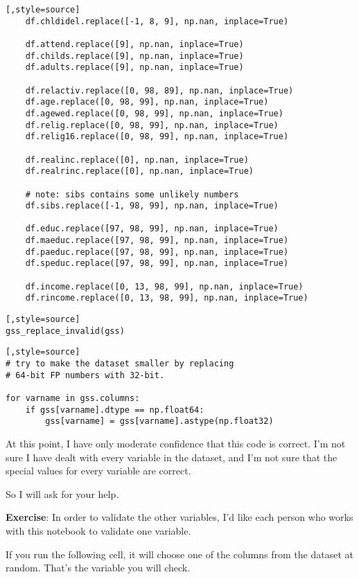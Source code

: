 \begin{lstlisting}[,style=source]
    df.chldidel.replace([-1, 8, 9], np.nan, inplace=True)

    df.attend.replace([9], np.nan, inplace=True)
    df.childs.replace([9], np.nan, inplace=True)
    df.adults.replace([9], np.nan, inplace=True)

    df.relactiv.replace([0, 98, 89], np.nan, inplace=True)
    df.age.replace([0, 98, 99], np.nan, inplace=True)
    df.agewed.replace([0, 98, 99], np.nan, inplace=True)
    df.relig.replace([0, 98, 99], np.nan, inplace=True)
    df.relig16.replace([0, 98, 99], np.nan, inplace=True)
    
    df.realinc.replace([0], np.nan, inplace=True)                  
    df.realrinc.replace([0], np.nan, inplace=True)                  
    
    # note: sibs contains some unlikely numbers
    df.sibs.replace([-1, 98, 99], np.nan, inplace=True)
    
    df.educ.replace([97, 98, 99], np.nan, inplace=True)
    df.maeduc.replace([97, 98, 99], np.nan, inplace=True)
    df.paeduc.replace([97, 98, 99], np.nan, inplace=True)
    df.speduc.replace([97, 98, 99], np.nan, inplace=True)
    
    df.income.replace([0, 13, 98, 99], np.nan, inplace=True)
    df.rincome.replace([0, 13, 98, 99], np.nan, inplace=True)    
\end{lstlisting}

\begin{lstlisting}[,style=source]
gss_replace_invalid(gss)
\end{lstlisting}

\begin{lstlisting}[,style=source]
# try to make the dataset smaller by replacing
# 64-bit FP numbers with 32-bit.

for varname in gss.columns:
    if gss[varname].dtype == np.float64:
        gss[varname] = gss[varname].astype(np.float32)
\end{lstlisting}

At this point, I have only moderate confidence that this code is
correct. I'm not sure I have dealt with every variable in the dataset,
and I'm not sure that the special values for every variable are correct.

So I will ask for your help.

\textbf{Exercise}: In order to validate the other variables, I'd like
each person who works with this notebook to validate one variable.

If you run the following cell, it will choose one of the columns from
the dataset at random. That's the variable you will check.

